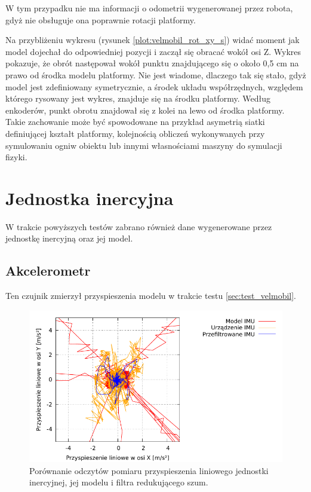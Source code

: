 		W tym przypadku nie ma informacji o odometrii wygenerowanej przez robota, gdyż nie obsługuje ona poprawnie rotacji platformy.
		
		Na przybliżeniu wykresu (rysunek \ref{plot:velmobil_rot_xy_s}) widać moment jak model dojechał do odpowiedniej pozycji i zaczął się obracać wokół osi Z. 
		Wykres pokazuje, że obrót następował wokół punktu znajdującego się o około 0,5 \si{\centi\metre} na prawo od środka modelu platformy.
		Nie jest wiadome, dlaczego tak się stało, gdyż model jest zdefiniowany symetrycznie, a środek układu współrzędnych, względem którego rysowany jest wykres, znajduje się 
		na środku platformy.
		Według enkoderów, punkt obrotu znajdował się z kolei na lewo od środka platformy.
		Takie zachowanie może być spowodowane na przykład asymetrią siatki definiującej kształt platformy, kolejnością obliczeń wykonywanych przy symulowaniu ogniw 
		obiektu lub innymi własnościami maszyny do symulacji fizyki.
	
\section{Jednostka inercyjna}
	\label{sec:test_imu}
	W trakcie powyższych testów zabrano również dane wygenerowane przez jednostkę inercyjną oraz jej model.
	\subsection{Akcelerometr}
		Ten czujnik zmierzył przyspieszenia modelu w trakcie testu \ref{sec:test_velmobil}.
		
		\begin{figure}[H]
			\centering
			\includegraphics[width=\textwidth]{plots/imu_xy.pdf}
				\caption{Porównanie odczytów pomiaru przyspieszenia liniowego jednostki inercyjnej, jej modelu i filtra redukującego szum.}
			\label{plot:imu_xy}
		\end{figure}
		
